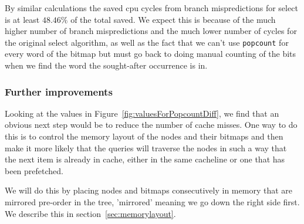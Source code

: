 By similar calculations the saved cpu cycles from branch mispredictions for select is at least $48.46\%$ of the total saved. We expect this is because of the much higher number of branch mispredictions and the much lower number of cycles for the original select algorithm, as well as the fact that we can't use \texttt{popcount} for every word of the bitmap but must go back to doing manual counting of the bits when we find the word the sought-after occurrence is in.

\subsubsection{Further improvements}
Looking at the values in Figure~\ref{fig:valuesForPopcountDiff}, we find that an obvious next step would be to reduce the number of cache misses. One way to do this is to control the memory layout of the nodes and their bitmaps and then make it more likely that the queries will traverse the nodes in such a way that the next item is already in cache, either in the same cacheline or one that has been prefetched.

We will do this by placing nodes and bitmaps consecutively in memory that are mirrored pre-order in the tree, 'mirrored' meaning we go down the right side first.
We describe this in section~\ref{sec:memorylayout}.